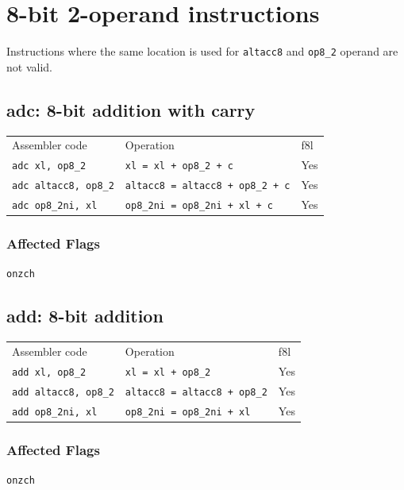 \documentclass{book}
\begin{document}
\section{8-bit 2-operand instructions}

Instructions where the same location is used for \texttt{altacc8} and \texttt{op8\_2} operand are not valid.

\subsection{adc: 8-bit addition with carry}

\begin{tabular}{l l l}
Assembler code               & Operation                               & f8l \\
\texttt{adc xl, op8\_2}      & \texttt{xl = xl + op8\_2 + c}           & Yes \\
\texttt{adc altacc8, op8\_2} & \texttt{altacc8 = altacc8 + op8\_2 + c} & Yes \\
\texttt{adc op8\_2ni, xl}    & \texttt{op8\_2ni = op8\_2ni + xl + c}   & Yes
\end{tabular}

\subsubsection*{Affected Flags}

\texttt{onzch}


\subsection{add: 8-bit addition}

\begin{tabular}{l l l}
Assembler code               & Operation                           & f8l \\
\texttt{add xl, op8\_2}      & \texttt{xl = xl + op8\_2}           & Yes \\
\texttt{add altacc8, op8\_2} & \texttt{altacc8 = altacc8 + op8\_2} & Yes \\
\texttt{add op8\_2ni, xl}    & \texttt{op8\_2ni = op8\_2ni + xl}   & Yes
\end{tabular}

\subsubsection*{Affected Flags}

\texttt{onzch}
\end{document}
